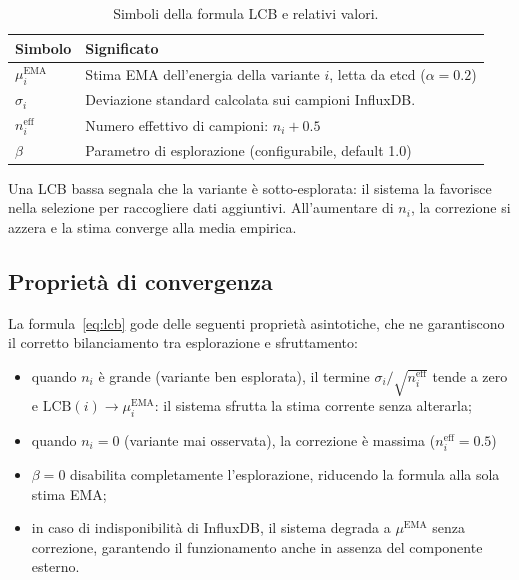 \begin{table}[t]
    \centering
    \small
    \begin{tabular}{lp{9.5cm}}
        \toprule
        \textbf{Simbolo} & \textbf{Significato} \\
        \midrule
        $\mu_i^\text{EMA}$ &
            Stima EMA dell'energia della variante $i$, letta da etcd
            ($\alpha = 0.2$) \\
        $\sigma_i$ &
            Deviazione standard calcolata sui campioni InfluxDB.\\
        $n_i^\text{eff}$ &
            Numero effettivo di campioni: $n_i + 0.5$ \\
        $\beta$ &
            Parametro di esplorazione (configurabile, default 1.0) \\
        \bottomrule
    \end{tabular}
    \caption{Simboli della formula LCB e relativi valori.}
    \label{tab:lcb-simboli}
\end{table}
 
Una LCB bassa segnala che la variante è sotto-esplorata: il sistema la favorisce
nella selezione per raccogliere dati aggiuntivi. All'aumentare di
$n_i$, la correzione si azzera e la stima converge alla media empirica.
 
 
\subsection{Proprietà di convergenza}
\label{subsec:ucb-convergenza}
 
La formula~\eqref{eq:lcb} gode delle seguenti proprietà asintotiche,
che ne garantiscono il corretto bilanciamento tra esplorazione e
sfruttamento:
 
\begin{itemize}
    \item quando $n_i$ è grande (variante ben esplorata), il termine
    $\sigma_i / \sqrt{n_i^\text{eff}}$ tende a zero e
    $\mathrm{LCB}(i) \to \mu_i^\text{EMA}$: il sistema sfrutta la
    stima corrente senza alterarla;
 
    \item quando $n_i = 0$ (variante mai osservata), la correzione è
    massima ($n_i^\text{eff} = 0.5$)
 
    \item $\beta = 0$ disabilita completamente l'esplorazione,
    riducendo la formula alla sola stima EMA;
 
    \item in caso di indisponibilità di InfluxDB, il sistema degrada a
    $\mu^\text{EMA}$ senza correzione, garantendo il funzionamento
    anche in assenza del componente esterno.
\end{itemize}
 
